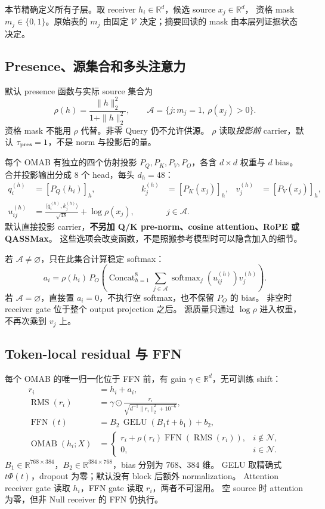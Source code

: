 \documentclass[11pt,UTF8,fontset=fandol]{ctexart}
\newcommand{\R}{\mathbb R}\newcommand{\V}{\mathcal V}\newcommand{\Q}{\mathcal Q}
\newcommand{\Nul}{\mathcal N}\newcommand{\ind}{\mathbf 1}
\newcommand{\sm}{\operatorname{softmax}}\newcommand{\OMAB}{\operatorname{OMAB}}
\newcommand{\Norm}{\operatorname{RMS}}\newcommand{\FFN}{\operatorname{FFN}}
\begin{document}
本节精确定义所有子层。取 receiver $h_i\in\R^d$，候选 source $x_j\in\R^d$，
资格 mask $m_j\in\{0,1\}$。原始表的 $m_j$ 由固定 $\V$ 决定；摘要回读的 mask 由本层列证据状态决定。

\subsection{Presence、源集合和多头注意力}
默认 presence 函数与实际 source 集合为
\begin{equation}
 \rho(h)=\frac{\|h\|_2^2}{1+\|h\|_2^2},\qquad
 \mathcal A=\{j:m_j=1,\ \rho(x_j)>0\}.
 \label{eq:presence}
\end{equation}
资格 mask 不能用 $\rho$ 代替。非零 Query 仍不允许供源。
$\rho$ 读取\emph{投影前} carrier，默认 $\tau_{\rm pres}=1$，不是 norm 与投影后的量。

每个 OMAB 有独立的四个仿射投影 $P_Q,P_K,P_V,P_O$，各含 $d\times d$ 权重与 $d$ bias。
合并投影输出分成 8 个 head，每头 $d_h=48$：
\begin{align}
 q_i^{(h)}&=[P_Q(h_i)]_h,&k_j^{(h)}&=[P_K(x_j)]_h,&v_j^{(h)}&=[P_V(x_j)]_h,\\
 u_{ij}^{(h)}&=\frac{\langle q_i^{(h)},k_j^{(h)}\rangle}{\sqrt{48}}+\log\rho(x_j),
 &&j\in\mathcal A.\label{eq:attn-logit}
\end{align}
默认直接投影 carrier，\textbf{不另加 Q/K pre-norm、cosine attention、RoPE 或 QASSMax}。
这些选项会改变函数，不是照搬参考模型时可以隐含加入的细节。

若 $\mathcal A\ne\varnothing$，只在此集合计算稳定 softmax：
\begin{equation}
 a_i=\rho(h_i)\,P_O\!\left(\operatorname{Concat}_{h=1}^{8}
       \sum_{j\in\mathcal A}\sm_{j}(u_{ij}^{(h)})v_j^{(h)}\right).
 \label{eq:attention}
\end{equation}
若 $\mathcal A=\varnothing$，直接置 $a_i=0$，不执行空 softmax，也不保留 $P_O$ 的 bias。
非空时 receiver gate 位于整个 output projection 之后。
源质量只通过 $\log\rho$ 进入权重，不再次乘到 $v_j$ 上。

\subsection{Token-local residual 与 FFN}
每个 OMAB 的唯一归一化位于 FFN 前，有 gain $\gamma\in\R^d$，无可训练 shift：
\begin{align}
 r_i&=h_i+a_i,\\
 \Norm(r_i)&=\gamma\odot\frac{r_i}{\sqrt{d^{-1}\|r_i\|_2^2+10^{-6}}},\\
 \FFN(t)&=B_2\,\operatorname{GELU}(B_1t+b_1)+b_2,\\
 \OMAB(h_i;X)&=\begin{cases}
 r_i+\rho(r_i)\FFN(\Norm(r_i)),&i\notin\Nul,\\
 0,&i\in\Nul.
 \end{cases}\label{eq:omab}
\end{align}
$B_1\in\R^{768\times384}$，$B_2\in\R^{384\times768}$，bias 分别为 768、384 维。
GELU 取精确式 $t\Phi(t)$，dropout 为零；默认没有 block 后额外 normalization。
Attention receiver gate 读取 $h_i$，FFN gate 读取 $r_i$，两者不可混用。
空 source 时 attention 为零，但非 Null receiver 的 FFN 仍执行。
\end{document}
